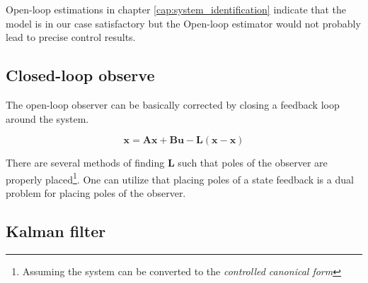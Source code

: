 Open-loop estimations in chapter \ref{cap:system_identification} indicate that the model is in our case satisfactory but the Open-loop estimator would not probably lead to precise control results.

\subsection{Closed-loop observe}

The open-loop observer can be basically corrected by closing a feedback loop around the system.

\begin{equation}
\textbf{\^x} = \textbf{A}\textbf{\^x} + \textbf{B}\textbf{u} - \textbf{L}\left(\textbf{x} - \textbf{\^x}\right)
\end{equation}

There are several methods of finding $\textbf{L}$ such that poles of the observer are properly placed\footnote{Assuming the system can be converted to the \textit{controlled canonical form}}. One can utilize that placing poles of a state feedback is a dual problem for placing poles of the observer.

\subsection{Kalman filter}